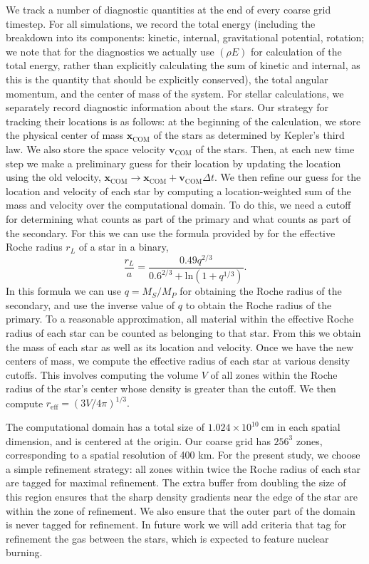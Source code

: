 \documentclass[iop]{emulateapj}
\begin{document}
We track a number of diagnostic quantities at the end of every coarse grid timestep. 
For all simulations, we record the total energy (including the breakdown into
its components: kinetic, internal, gravitational potential, rotation; we note
that for the diagnostics we actually use $(\rho E)$ for calculation of the total energy,
rather than explicitly calculating the sum of kinetic and internal, as this is
the quantity that should be explicitly conserved), 
the total angular momentum, and the center of mass of the system. 
For stellar calculations, we separately record diagnostic 
information about the stars. Our strategy for tracking their 
locations is as follows: at the beginning of the calculation, we store the 
physical center of mass $\mathbf{x}_{\text{COM}}$ of the stars as determined 
by Kepler's third law. We also store the space velocity $\mathbf{v}_{\text{COM}}$ 
of the stars. Then, at each new time step we make a preliminary guess for their 
location by updating the location using the old velocity, 
$\mathbf{x}_{\text{COM}} \rightarrow \mathbf{x}_{\text{COM}} + \mathbf{v}_{\text{COM}} \Delta t$.
We then refine our guess for the location and velocity of each star by computing a
location-weighted sum of the mass and velocity over the computational domain. 
To do this, we need a cutoff for determining what counts as part of the primary 
and what counts as part of the secondary. For this we can use the formula provided by 
\citet{eggleton:1983} for the effective Roche radius $r_L$ of a star in a binary,
\begin{equation}
  \frac{r_L}{a} = \frac{0.49 q^{2/3}}{0.6^{2/3} + \text{ln}(1 + q^{1/3})}.
\end{equation}
In this formula we can use $q = M_S / M_P$ for obtaining the Roche radius of the secondary,
and use the inverse value of $q$ to obtain the Roche radius of the primary.
To a reasonable approximation, all material within the effective Roche radius
of each star can be counted as belonging to that star. From this we obtain the mass
of each star as well as its location and velocity. Once we have the new centers of mass,
we compute the effective radius of each star at various density cutoffs. This involves 
computing the volume $V$ of all zones within the Roche radius of the star's center 
whose density is greater than the cutoff. We then compute $r_{\text{eff}} = (3V/4\pi)^{1/3}.$

The computational domain has a total size of $1.024 \times 10^{10}\ \text{cm}$ in each 
spatial dimension, and is centered at the origin. Our coarse grid has $256^3$ zones,
corresponding to a spatial resolution of 400 km. For the present study, we choose a simple 
refinement strategy: all zones within twice the Roche radius of each star are tagged for maximal 
refinement. The extra buffer from doubling the size of this region ensures that the sharp density
gradients near the edge of the star are within the zone of refinement. We also ensure that the 
outer part of the domain is never tagged for refinement. In future work we will add criteria 
that tag for refinement the gas between the stars, which is expected to feature nuclear burning.
\end{document}
